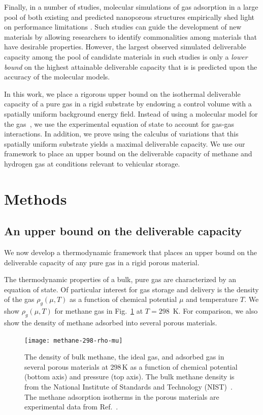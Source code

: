 \documentclass[pre,twocolumn]{revtex4-2}
\begin{document}
Finally, in a number of studies, molecular simulations of gas adsorption in
a large pool of both existing and predicted nanoporous
structures empirically shed light on performance limitations \cite{firlej2013understanding, goldsmith2013theoretical,
ahmed2019exceptional,simon2015materials}.
Such studies can guide the development of new materials
by allowing researchers to identify commonalities among materials that have
desirable properties.  
However, the largest observed simulated deliverable capacity among the pool of candidate materials in such studies
is only a \emph{lower bound} on the highest attainable deliverable capacity that is is predicted upon the accuracy of the molecular models.


In this work, we place a rigorous upper bound on the isothermal deliverable capacity of a
pure gas in a rigid substrate by endowing a control volume with a spatially
uniform background energy field. Instead of using a molecular model for the
gas~\cite{gomez2017impact}, we use the experimental equation of state to
account for gas-gas interactions. In addition, we prove using the calculus of
variations that this spatially uniform substrate yields a maximal deliverable
capacity. We use our framework to place an upper bound on the deliverable
capacity of methane and hydrogen gas at conditions relevant to vehicular storage.

\section{Methods}
\subsection{An upper bound on the deliverable capacity}\label{sec:upper-bound}
We now develop a thermodynamic framework that places an upper bound on the deliverable capacity of any pure gas in a rigid porous material.

The thermodynamic properties of a bulk, pure gas are characterized by an
equation of state. Of particular interest for gas storage and delivery is the
density of the gas $\rho_g(\mu,T)$ as a function of chemical potential $\mu$
and temperature $T$. We show $\rho_g(\mu, T)$ for methane gas in
Fig.~\ref{fig:density-vs-mu-ch4} at $T=298$\ K. For comparison, we also show
the density of methane adsorbed into several porous materials.

\begin{figure}
    \centering
    \texttt{[image: methane-298-rho-mu]}
    \caption{The density of bulk methane, the ideal gas, and adsorbed gas in several porous materials at 298\,K as a function of chemical potential (bottom axis) and pressure (top axis). The bulk methane density is from the National Institute of Standards and Technology (NIST)~\cite{nist}. The methane adsorption isotherms in the porous materials are experimental data from Ref.~\cite{mason2014evaluating, furukawa2009storage, tian2018sol, gandara2014high, zhang2017fine}.
    }
    \label{fig:density-vs-mu-ch4}
  \end{figure}
  
\end{document}
